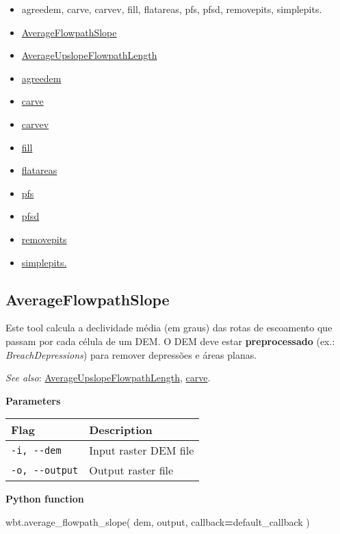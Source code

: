 \documentclass[
]{book}
\newenvironment{Shaded}{\begin{snugshade}}{\end{snugshade}}
\newcommand{\NormalTok}[1]{#1}
\newcommand{\OperatorTok}[1]{\textcolor[rgb]{0.81,0.36,0.00}{\textbf{#1}}}
\theoremstyle{definition}
\theoremstyle{definition}
\theoremstyle{definition}
\theoremstyle{definition}
\theoremstyle{remark}
\begin{document}
\begin{itemize}
\item
  agreedem, carve, carvev, fill, flatareas, pfs, pfsd, removepits, simplepits.
\item
  \hyperref[AverageFlowpathSlope]{AverageFlowpathSlope}
\item
  \hyperref[AverageUpslopeFlowpathLength]{AverageUpslopeFlowpathLength}
\item
  \hyperref[agreedem]{agreedem}
\item
  \hyperref[carve]{carve}
\item
  \hyperref[carvev]{carvev}
\item
  \hyperref[fill]{fill}
\item
  \hyperref[flatareas]{flatareas}
\item
  \hyperref[pfs]{pfs}
\item
  \hyperref[pfsd]{pfsd}
\item
  \hyperref[removepits]{removepits}
\item
  \hyperref[simplepits.]{simplepits.}
\end{itemize}

\subsection{AverageFlowpathSlope}\label{AverageFlowpathSlope}

Este tool calcula a declividade média (em graus) das rotas de escoamento que passam por cada célula de um DEM.
O DEM deve estar \textbf{preprocessado} (ex.: \emph{BreachDepressions}) para remover depressões e áreas planas.

\emph{See also}: \hyperref[AverageUpslopeFlowpathLength]{AverageUpslopeFlowpathLength}, \hyperref[carve]{carve}.

\textbf{Parameters}

\begin{longtable}[]{@{}ll@{}}
\toprule\noalign{}
Flag & Description \\
\midrule\noalign{}
\endhead
\bottomrule\noalign{}
\endlastfoot
\texttt{-i,\ -\/-dem} & Input raster DEM file \\
\texttt{-o,\ -\/-output} & Output raster file \\
\end{longtable}

\textbf{Python function}

\begin{Shaded}
\begin{Highlighting}[]
\NormalTok{wbt.average\_flowpath\_slope(}
\NormalTok{    dem,}
\NormalTok{    output,}
\NormalTok{    callback}\OperatorTok{=}\NormalTok{default\_callback}
\NormalTok{)}
\end{Highlighting}
\end{Shaded}
\end{document}
